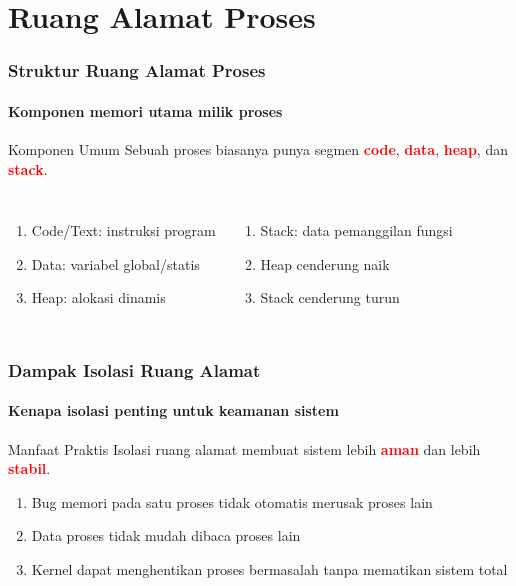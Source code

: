 \documentclass[t,aspectratio=169,xcolor=dvipsnames]{beamer}
\newcommand{\tem}[1]{\textbf{\textcolor{red}{#1}}}
\begin{document}
\section{Ruang Alamat Proses}

\begin{frame}
    \frametitle{Struktur Ruang Alamat Proses}
    \framesubtitle{Komponen memori utama milik proses}
    \begin{exampleblock}{Komponen Umum}
        Sebuah proses biasanya punya segmen \tem{code}, \tem{data}, \tem{heap}, dan \tem{stack}.
    \end{exampleblock}
    \vspace{0.1cm}
    \small
    \begin{columns}[T]
        \begin{enumerate}
            \item Code/Text: instruksi program
            \item Data: variabel global/statis
            \item Heap: alokasi dinamis
        \end{enumerate}
        \begin{enumerate}
            \item Stack: data pemanggilan fungsi
            \item Heap cenderung naik
            \item Stack cenderung turun
        \end{enumerate}
    \end{columns}
\end{frame}

\begin{frame}
    \frametitle{Dampak Isolasi Ruang Alamat}
    \framesubtitle{Kenapa isolasi penting untuk keamanan sistem}
    \begin{alertblock}{Manfaat Praktis}
        Isolasi ruang alamat membuat sistem lebih \tem{aman} dan lebih \tem{stabil}.
    \end{alertblock}
    \vspace{0.1cm}
    \small
    \begin{enumerate}
        \item Bug memori pada satu proses tidak otomatis merusak proses lain
        \item Data proses tidak mudah dibaca proses lain
        \item Kernel dapat menghentikan proses bermasalah tanpa mematikan sistem total
    \end{enumerate}
\end{frame}
\end{document}

